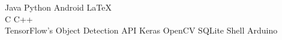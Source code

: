 \documentclass[letterpaper]{deedy-resume} %
\begin{document}
\begin{minipage}[t]{0.33\textwidth}
Java \textbullet{} Python \textbullet{} Android \textbullet{} \LaTeX\ \\ 
C \textbullet{} C++ \\
TensorFlow's Object Detection API \textbullet{} Keras \textbullet{} OpenCV \textbullet{} SQLite \textbullet{} Shell  \textbullet{} Arduino

\sectionspace %


\end{minipage} %
\hfill
%
%
\end{document}
